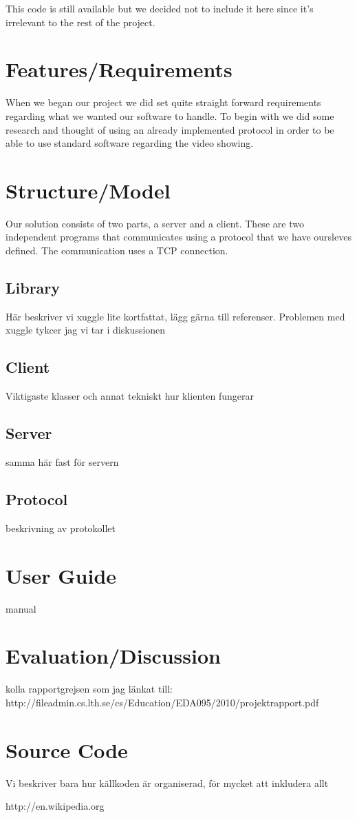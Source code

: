 \documentclass[a4paper]{article}
\begin{document}
This code is still available but we decided not to include it here since it's irrelevant to the rest of the project. 

\section{Features/Requirements}
When we began our project we did set quite straight forward requirements regarding what we wanted our software to handle. To begin with we did some research and thought of using an already implemented protocol in order to be able to use standard software regarding the video showing. 

\section{Structure/Model}
Our solution consists of two parts, a server and a client. These are two independent programs that communicates using a protocol that we have oursleves defined. The communication uses a TCP connection.

\subsection{Library}
Här beskriver vi xuggle lite kortfattat, lägg gärna till referenser. Problemen med xuggle tykcer jag vi tar i diskussionen

\subsection{Client}
Viktigaste klasser och annat tekniskt hur klienten fungerar

\subsection{Server}
samma här fast för servern

\subsection{Protocol}
beskrivning av protokollet

\section{User Guide}
manual

\section{Evaluation/Discussion}
kolla rapportgrejsen som jag länkat till: http://fileadmin.cs.lth.se/cs/Education/EDA095/2010/projektrapport.pdf
\section{Source Code}
Vi beskriver bara hur källkoden är organiserad, för mycket att inkludera allt




\begin{thebibliography}{1}
http://en.wikipedia.org
\end{thebibliography}
\end{document}
